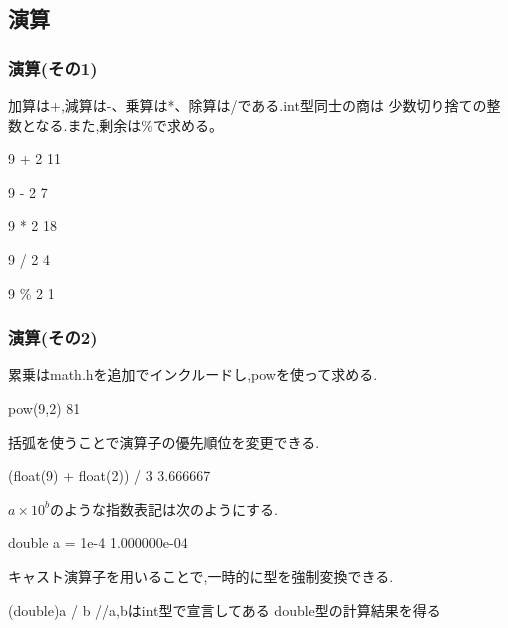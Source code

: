 \documentclass[dvipdfmx]{beamer}
\begin{document}
\subsection{演算}
\begin{frame}[t,fragile, label=15]
    \frametitle{演算(その1)}
    加算は+,減算は-、乗算は*、除算は/である.int型同士の商は
    少数切り捨ての整数となる.また,剰余は\%で求める。
    \begin{block}{9 + 2}
        11
    \end{block}
    \begin{block}{9 - 2}
        7
    \end{block}
    \begin{block}{9 * 2}
        18  
    \end{block}
    \begin{block}{9 / 2}
        4   
    \end{block}
    \begin{block}{9 \% 2}
        1   
    \end{block}
    \vfill \hfill 
    \hyperlink{14}{}
    \space
    \hyperlink{16}{}
\end{frame}

\begin{frame}[t, label=16]
    \frametitle{演算(その2)}
    累乗はmath.hを追加でインクルードし,powを使って求める.
    \begin{block}{pow(9,2)}
        81
    \end{block}
    括弧を使うことで演算子の優先順位を変更できる.
    \begin{block}{(float(9) + float(2)) / 3}
        3.666667
    \end{block}
    $a\times 10^{b}$のような指数表記は次のようにする.
    \begin{block}{double a = 1e-4}
        1.000000e-04
    \end{block}
    キャスト演算子を用いることで,一時的に型を強制変換できる.
    \begin{block}{(double)a / b //a,bはint型で宣言してある}
        double型の計算結果を得る
    \end{block}
    \vfill \hfill 
    \hyperlink{15}{}
    \space
    \hyperlink{17}{}
\end{frame}
\end{document}
